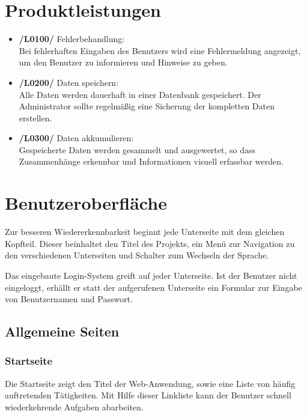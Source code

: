 \documentclass[a4paper,oneside,10pt]{scrreprt}
\begin{document}
\chapter{Produktleistungen}

\begin{itemize}
\item \textbf{/L0100/} Fehlerbehandlung: \\
Bei fehlerhaften Eingaben des Benutzers wird eine Fehlermeldung angezeigt, um den Benutzer zu informieren und Hinweise zu geben.

\item \textbf{/L0200/} Daten speichern: \\
Alle Daten werden dauerhaft in einer Datenbank gespeichert. Der Administrator sollte regelmäßig eine Sicherung der kompletten Daten erstellen.

\item \textbf{/L0300/} Daten akkumulieren: \\
Gespeicherte Daten werden gesammelt und ausgewertet, so dass Zusammenhänge erkennbar und Informationen visuell erfassbar werden.
\end{itemize}


\chapter{Benutzeroberfläche}

Zur besseren Wiedererkennbarkeit beginnt jede Unterseite mit dem gleichen Kopfteil. Dieser beinhaltet den Titel des Projekts, ein Menü zur Navigation zu den verschiedenen Unterseiten und Schalter zum Wechseln der Sprache.

Das eingebaute Login-System greift auf jeder Unterseite. Ist der Benutzer nicht eingeloggt, erhällt er statt der aufgerufenen Unterseite ein Formular zur Eingabe von Benutzernamen und Passwort.

\section{Allgemeine Seiten}

\subsection*{Startseite}

Die Startseite zeigt den Titel der Web-Anwendung, sowie eine Liste von häufig auftretenden Tätigkeiten. Mit Hilfe dieser Linkliste kann der Benutzer schnell wiederkehrende Aufgaben abarbeiten.
\end{document}
